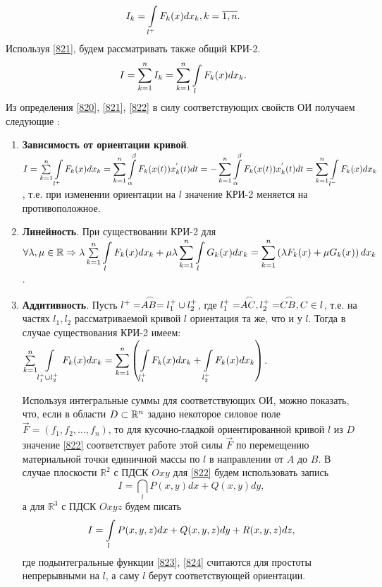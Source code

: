 \begin{equation}
\label{821}
I_k = \displaystyle\int\limits_{l^{+}} F_k (x) dx_k, k = \overline{1,n}.
\end{equation}
Используя \eqref{821}, будем рассматривать также общий КРИ-2.
\begin{equation}
\label{822}
I = \sum_{k=1}^{n} I_k = \sum_{k=1}^{n} \displaystyle\int\limits_{l} F_k (x) dx_k.
\end{equation}
Из определения \eqref{820}, \eqref{821}, \eqref{822} в силу соответствующих свойств ОИ получаем следующие : 
\begin{enumerate}
	\item \textbf{Зависимость от ориентации кривой}. $I = \sum\limits_{k=1}^{n} \displaystyle\int\limits_{l^{+}} F_k(x) dx_k = \sum_{k=1}^{n} \displaystyle\int\limits_{\alpha}^{\beta} F_k(x(t)) x_k^{'}(t) dt = - \sum_{k=1}^{n} \displaystyle\int\limits_{\alpha}^{\beta} F_k (x(t)) x_k^{'}(t) dt = \sum_{k=1}^{n} \displaystyle\int\limits_{l^{-}} F_k(x) dx_k$, т.е. при изменении ориентации на $l$ значение КРИ-2 меняется на противоположное. 
	\item \textbf{Линейность}. При существовании КРИ-2 для $\forall \lambda, \mu \in \mathbb{R} \Rightarrow \\	
	\lambda \sum\limits_{k=1}^{n} \displaystyle\int\limits_l F_k(x) dx_k + \mu \lambda \sum\limits_{k=1}^{n} \displaystyle\int\limits_l G_k(x) dx_k = \sum\limits_{k=1}^{n} \left(\lambda F_k(x) + \mu G_k(x)\right)dx_k$.
	\item \textbf{Аддитивность}. Пусть $l^+ = \arc{AB} = l_1^+ \cup l_2^+$, где $l_1^+ = \arc{AC}, l_2^+ = \arc{CB}, C \in l$, т.е. на частях $l_1, l_2$ рассматриваемой кривой $l$ ориентация та же, что и у $l$. Тогда в случае существования КРИ-2 имеем:
	$\sum\limits_{k=1}^{n} \displaystyle\int\limits_{{l_1^{+} \cup l_2^{+}}} F_k(x) dx_k = \sum_{k=1}^{n} \left( \displaystyle\int\limits_{l_1^{+}} F_k(x) dx_k + \displaystyle\int\limits_{l_2^{+}} F_k(x) dx_k \right)$.
	
	Используя интегральные суммы для соответствующих ОИ, можно показать, что, если в области $D \subset \mathbb{R}^n$ задано некоторое силовое поле $\overrightarrow{F} = (f_1, f_2, \ldots, f_n)$, то для кусочно-гладкой ориентированной кривой $l$ из $D$ значение \eqref{822} соответствует работе этой силы $\overrightarrow{F}$ по перемещению материальной точки единичной массы по $l$ в направлении от $A$ до $B$. В случае плоскости $\mathbb{R}^2$ с ПДСК $Oxy$ для \eqref{822} будем использовать запись
	\begin{equation}
	\label{823}
	I = \dint_l P(x,y)dx + Q(x,y)dy ,
	\end{equation}
	а для $\mathbb{R}^3$ с ПДСК $Oxyz$ будем писать
	\begin{equation}
	\label{824}
	I = \displaystyle\int\limits_l P(x,y,z)dx + Q(x,y,z)dy + R(x,y,z)dz,
	\end{equation}
	где подынтегральные функции \eqref{823}, \eqref{824} считаются для простоты непрерывными на $l$, а саму $l$ берут соответствующей ориентации.
\end{enumerate}

